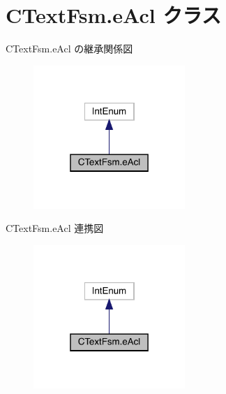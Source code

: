 \hypertarget{classCTextFsm_1_1eAcl}{}\section{C\+Text\+Fsm.\+e\+Acl クラス}
\label{classCTextFsm_1_1eAcl}


C\+Text\+Fsm.\+e\+Acl の継承関係図
\nopagebreak
\begin{figure}[H]
\begin{center}
\leavevmode
\includegraphics[width=163pt]{classCTextFsm_1_1eAcl__inherit__graph}
\end{center}
\end{figure}


C\+Text\+Fsm.\+e\+Acl 連携図
\nopagebreak
\begin{figure}[H]
\begin{center}
\leavevmode
\includegraphics[width=163pt]{classCTextFsm_1_1eAcl__coll__graph}
\end{center}
\end{figure}

